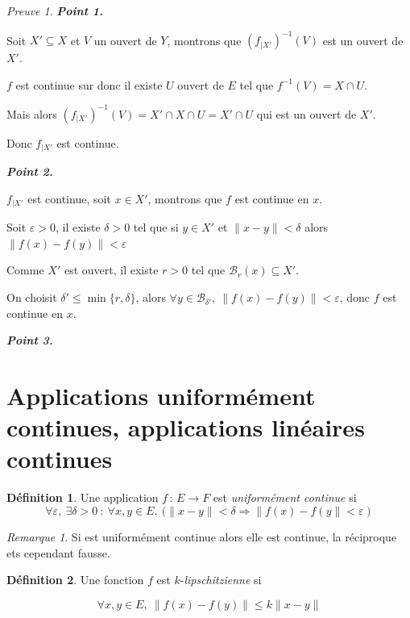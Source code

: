 \documentclass[]{article}
\theoremstyle{remark}
\newtheorem{myrem}{Remarque}
\newtheorem{myproof}{Preuve}
\theoremstyle{definition}
\newtheorem{mydef}{Définition}
\newcommand{\funcshort}[3]{
#1 \, : \, #2 \longrightarrow #3
}
\newenvironment{proofpart}[1]{
	\leavevmode
	
	\noindent
	{\textit{\textbf{\boldmath #1}}}
	
}{
	\checkmark
}
\begin{document}
\begin{myproof}
	\begin{proofpart}{Point 1.}
		Soit $X' \subseteq X$ et $V$ un ouvert de $Y$, montrons que $\left(f_{|X'}\right)^{-1}(V)$ est un ouvert de $X'$.
		
		$f$ est continue sur donc il existe $U$ ouvert de $E$ tel que $f^{-1}(V)= X \cap U$.
		
		Mais alors $\left(f_{|X'}\right)^{-1}(V) = X' \cap X \cap U = X' \cap U$ qui est un ouvert de $X'$.
		
		Donc $f_{|X'}$ est continue.
	\end{proofpart}
	
	\begin{proofpart}{Point 2.}
		$f_{|X'}$ est continue, soit $x \in X'$, montrons que $f$ est continue en $x$.
		
		Soit $\varepsilon > 0$, il existe $\delta
		 > 0$ tel que si $y \in X'$ et $\|x-y\| < \delta$ alors $\|f(x)-f(y)\| < \varepsilon$
		 
		 Comme $X'$ est ouvert, il existe $r > 0$ tel que $\mathcal{B}_r(x) \subseteq X'$.
		 
		 On choisit $\delta' \leqslant \min\{r, \delta\}$, alors $\forall y \in \mathcal{B}_{\delta'}, ~ \|f(x)-f(y)\| < \varepsilon$, donc $f$ est continue en $x$.
	\end{proofpart}
	
	\begin{proofpart}{Point 3.}
	\end{proofpart}
\end{myproof}


\section{Applications uniformément continues, applications linéaires continues}

\begin{mydef}
	Une application $\funcshort{f}{E}{F}$ est \textit{uniformément continue} si $$\forall \varepsilon, ~ \exists \delta > 0 ~ : ~ \forall x, y \in E, ~ (\|x-y\| < \delta \Longrightarrow \|f(x)-f(y\| < \varepsilon)$$
\end{mydef}

\begin{myrem}
	Si est uniformément continue alors elle est continue, la réciproque ets cependant fausse.
\end{myrem}

\begin{mydef}
	Une fonction $f$ est $k$-\textit{lipschitzienne} si
	
	$$\forall x, y \in E, ~ \|f(x)-f(y)\| \leqslant k \|x-y\|$$
\end{mydef}
\end{document}
